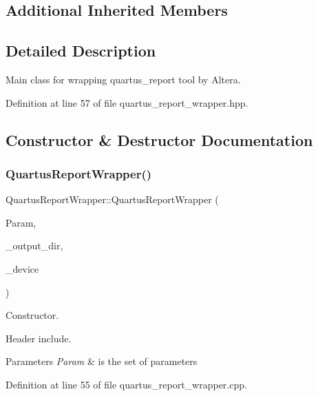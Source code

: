 \subsection*{Additional Inherited Members}


\subsection{Detailed Description}
Main class for wrapping quartus\+\_\+report tool by Altera. 

Definition at line 57 of file quartus\+\_\+report\+\_\+wrapper.\+hpp.



\subsection{Constructor \& Destructor Documentation}
\mbox{\label{classQuartusReportWrapper_a9a9043401bdb33ab3f80648479fa603d}} 
\subsubsection{\texorpdfstring{Quartus\+Report\+Wrapper()}{QuartusReportWrapper()}}
{\footnotesize\ttfamily Quartus\+Report\+Wrapper\+::\+Quartus\+Report\+Wrapper (\begin{DoxyParamCaption}\item[{const \hyperlink{Parameter_8hpp_a37841774a6fcb479b597fdf8955eb4ea}{Parameter\+Const\+Ref} \&}]{Param,  }\item[{const std\+::string \&}]{\+\_\+output\+\_\+dir,  }\item[{const \hyperlink{target__device_8hpp_acedb2b7a617e27e6354a8049fee44eda}{target\+\_\+device\+Ref} \&}]{\+\_\+device }\end{DoxyParamCaption})}



Constructor. 

Header include.


\begin{DoxyParams}{Parameters}
{\em Param} & is the set of parameters \\
\hline
\end{DoxyParams}


Definition at line 55 of file quartus\+\_\+report\+\_\+wrapper.\+cpp.



